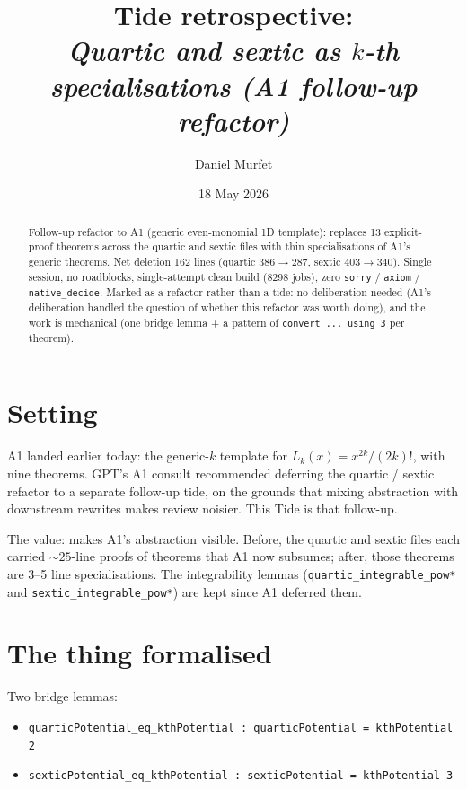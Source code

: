 \documentclass[11pt]{article}
\title{Tide retrospective:\\\emph{Quartic and sextic as $k$-th specialisations (A1 follow-up refactor)}}
\author{Daniel Murfet}
\date{18 May 2026}
\begin{document}
\maketitle

\begin{abstract}
Follow-up refactor to A1 (generic even-monomial 1D template):
replaces 13 explicit-proof theorems across the quartic and sextic
files with thin specialisations of A1's generic theorems. Net
deletion 162 lines (quartic $386 \to 287$, sextic $403 \to 340$).
Single session, no roadblocks, single-attempt clean build (8298
jobs), zero \texttt{sorry} / \texttt{axiom} / \texttt{native\_decide}.
Marked as a refactor rather than a tide: no deliberation needed
(A1's deliberation handled the question of whether this refactor was
worth doing), and the work is mechanical (one bridge lemma + a
pattern of \texttt{convert ... using 3} per theorem).
\end{abstract}

\section{Setting}

A1 landed earlier today: the generic-$k$ template for
$L_k(x) = x^{2k}/(2k)!$, with nine theorems. GPT's A1 consult
recommended deferring the quartic / sextic refactor to a separate
follow-up tide, on the grounds that mixing abstraction with
downstream rewrites makes review noisier. This Tide is that
follow-up.

The value: makes A1's abstraction visible. Before, the quartic and
sextic files each carried ${\sim}25$-line proofs of theorems that
A1 now subsumes; after, those theorems are 3--5 line specialisations.
The integrability lemmas
(\texttt{quartic\_integrable\_pow*} and
\texttt{sextic\_integrable\_pow*}) are kept since A1 deferred them.

\section{The thing formalised}

Two bridge lemmas:

\begin{itemize}[leftmargin=1.5em]
\item \texttt{quarticPotential\_eq\_kthPotential : quarticPotential = kthPotential 2}
\item \texttt{sexticPotential\_eq\_kthPotential : sexticPotential = kthPotential 3}
\end{itemize}
\end{document}
